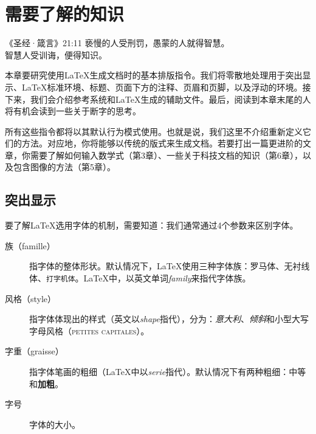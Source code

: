 \chapter{需要了解的知识}

\begin{epigraphe}{《圣经·箴言》21:11}
    亵慢的人受刑罚，愚蒙的人就得智慧。\\智慧人受训诲，便得知识。
\end{epigraphe}


本章要研究使用\LaTeX 生成文档时的基本排版指令。我们将零散地处理用于突出显示、\LaTeX 标准环境、标题、页面下方的注释、页眉和页脚，以及浮动的环境。接下来，我们会介绍参考系统和\LaTeX 生成的辅助文件。最后，阅读到本章末尾的人将有机会读到一些关于断字的思考。

所有这些指令都将以其默认行为模式使用。也就是说，我们这里不介绍重新定义它们的方法。对应地，你将能够以传统的版式来生成文档。若要打出一篇更进阶的文章，你需要了解如何输入数学式（第3章）、一些关于科技文档的知识（第6章），以及包含图像的方法（第5章）。

\section{突出显示}

要了解\LaTeX 选用字体的机制，需要知道：我们通常通过4个参数来区别字体。

\begin{description}
  \item[族（famille）] 指字体的整体形状。默认情况下，\LaTeX 使用三种字体族：罗马体、\textsf{无衬线体}、\texttt{打字机体}。\LaTeX 中，以英文单词\emph{family}来指代字体族。
  \item[风格（style）] 指字体体现出的样式（英文以\emph{shape}指代），分为：\textit{意大利}、\textsl{倾斜}和小型大写字母风格（\textsc{petites capitales}）。
  \item [字重（graisse）]指字体笔画的粗细（\LaTeX 中以\emph{serie}指代）。默认情况下有两种粗细：中等和\textbf{加粗}。
  \item [字号]字{\large 体}{\Large 的}{\LARGE 大}{\small 小}。
\end{description}


